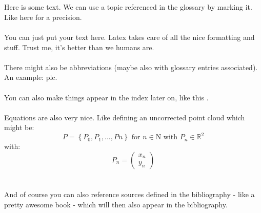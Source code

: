 
\chapter{}	%
\label{chap:FirstSampleChapter}				%
Here is some text. We can use a topic referenced in the glossary by marking it. Like here for a \gls{precision}.
\\
\\
You can just put your text here. Latex takes care of all the nice formatting and stuff. Trust me, it's better than we humans are.
\\
\\
There might also be abbreviations (maybe also with glossary entries associated). An example: \gls{plc}.
\\
\\
You can also make things appear in the index later on, like this .
\\
\\
Equations are also very nice. Like defining an uncorrected point cloud which might be: 
% 
 \begin{equation}
	P=\left\{ P_0, P_1,..., Pn \right\} \text{ for } n \in \mathrm{N} \text{ with } P_n \in \mathbb{R}^2
 \end{equation}
 with:
  \begin{equation}
 P_n=\left(\begin{array}{c}x_n\\ y_n\end{array}\right)
  \end{equation}
%
\\
\\
And of course you can also reference sources defined in the bibliography - like a pretty awesome book \cite{adams:hitchhikersguide} - which will then also appear in the bibliography.
